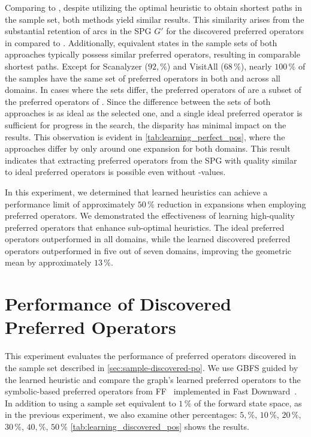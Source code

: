 \documentclass[ppgc,diss,english]{iiufrgs}
\begin{document}
Comparing \pogstar to \pog, despite \pogstar utilizing the optimal heuristic \hstar to obtain shortest paths in the sample set, both methods yield similar results. This similarity arises from the substantial retention of arcs in the SPG $G'$ for the discovered preferred operators in \pog compared to \pogstar. Additionally, equivalent states in the sample sets of both approaches typically possess similar preferred operators, resulting in comparable shortest paths. Except for Scanalyzer ($92,\%$) and VisitAll ($68\,\%$), nearly $100\,\%$ of the samples have the same set of preferred operators in both \pogstar and \pog across all domains. In cases where the sets differ, the preferred operators of \pog are a subset of the preferred operators of \pogstar. Since the difference between the sets of both approaches is as ideal as the selected one, and a single ideal preferred operator is sufficient for progress in the search, the disparity has minimal impact on the results. This observation is evident in \cref{tab:learning_perfect_pos}, where the approaches differ by only around one expansion for both domains. This result indicates that extracting preferred operators from the SPG with quality similar to ideal preferred operators is possible even without \hstar-values.

In this experiment, we determined that learned heuristics can achieve a performance limit of approximately $50\,\%$ reduction in expansions when employing preferred operators. We demonstrated the effectiveness of learning high-quality preferred operators that enhance sub-optimal heuristics. The ideal preferred operators \postar outperformed \hnn in all domains, while the learned discovered preferred operators \pog outperformed \hnn in five out of seven domains, improving the geometric mean by approximately $13\,\%$.

\section{Performance of Discovered Preferred Operators}
\label{sec:exp-performance-po}
This experiment evaluates the performance of preferred operators discovered in the sample set described in \cref{sec:sample-discovered-po}. We use GBFS guided by the learned heuristic \hnn and compare the graph's learned preferred operators \pog to the symbolic-based preferred operators \poff from FF~\cite{Hoffmann.Nebel/2001} implemented in Fast Downward~\cite{Helmert/2006}. In addition to using a sample set equivalent to $1\,\%$ of the forward state space, as in the previous experiment, we also examine other percentages: $5,\%$, $10\,\%$, $20\,\%$, $30\,\%$, $40,\%$, $50\,\%$ \cref{tab:learning_discovered_pos} shows the results.
\end{document}

